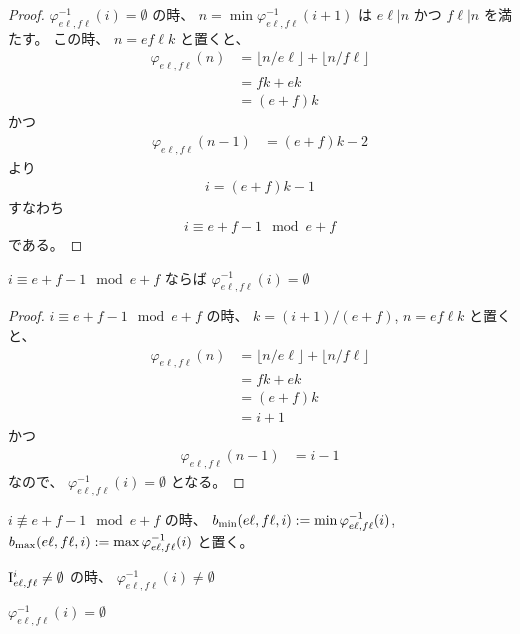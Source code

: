 \begin{proof}
$
\varphi_{e \ell, f \ell}^{-1}(i) = \emptyset
$
の時、
$
n = \min \varphi_{e \ell, f \ell}^{-1}(i+1)
$
は
$
e \ell | n
$
かつ
$
f \ell | n
$
を満たす。
この時、
$
n = e f \ell k
$
と置くと、
\begin{align}
\varphi_{e \ell, f \ell}(n)
&= \lfloor n / e \ell \rfloor + \lfloor n / f \ell \rfloor \\
&= f k + e k \\
&= (e + f) k
\end{align}
かつ
\begin{align}
\varphi_{e \ell, f \ell}(n-1)
&= (e + f) k - 2
\end{align}
より
\begin{align}
i = (e + f) k - 1
\end{align}
すなわち
\begin{align}
i \equiv e + f - 1 \mod e + f
\end{align}
である。
\end{proof}

\begin{lemma}
$
i \equiv e + f - 1 \mod e + f
$
ならば
$
\varphi_{e \ell, f \ell}^{-1}(i) = \emptyset
$
\end{lemma}

\begin{proof}
$
i \equiv e + f - 1 \mod e + f
$
の時、
$
k = (i + 1) / (e + f)
$,
$
n = e f \ell k
$
と置くと、
\begin{align}
\varphi_{e \ell, f \ell}(n)
&= \lfloor n / e \ell \rfloor + \lfloor n / f \ell \rfloor \\
&= f k + e k \\
&= (e + f) k \\
&= i + 1
\end{align}
かつ
\begin{align}
\varphi_{e \ell, f \ell}(n-1)
&= i - 1
\end{align}
なので、
$
\varphi_{e \ell, f \ell}^{-1}(i) = \emptyset
$
となる。
\end{proof}

\begin{definition}
$
i \not \equiv e + f - 1 \mod e + f
$
の時、
$
b_{\mathrm{min}}(e \ell, f \ell, i) := \min \varphi_{e \ell, f \ell}^{-1}(i)
$,
$
b_{\mathrm{max}}(e \ell, f \ell, i) := \max \varphi_{e \ell, f \ell}^{-1}(i)
$
と置く。
\end{definition}

\begin{lemma}
$
\mathrm{I}_{e \ell, f \ell}^i \not = \emptyset
$
の時、
$
\varphi_{e \ell, f \ell}^{-1}(i) \not = \emptyset
$

$
\varphi_{e \ell, f \ell}^{-1}(i)
= \emptyset
$
\end{lemma}


